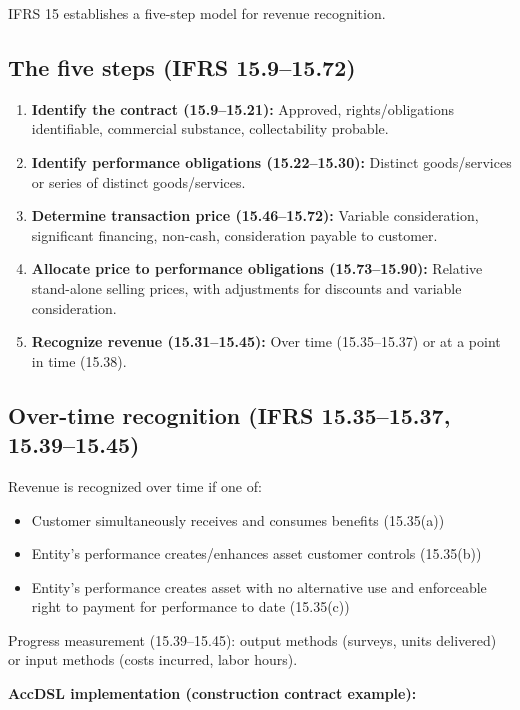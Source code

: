 IFRS 15 establishes a five-step model for revenue recognition.

\subsection{The five steps (IFRS 15.9--15.72)}

\begin{enumerate}
\item \textbf{Identify the contract (15.9--15.21):} Approved, rights/obligations
  identifiable, commercial substance, collectability probable.
\item \textbf{Identify performance obligations (15.22--15.30):} Distinct goods/services
  or series of distinct goods/services.
\item \textbf{Determine transaction price (15.46--15.72):} Variable consideration,
  significant financing, non-cash, consideration payable to customer.
\item \textbf{Allocate price to performance obligations (15.73--15.90):} Relative
  stand-alone selling prices, with adjustments for discounts and variable consideration.
\item \textbf{Recognize revenue (15.31--15.45):} Over time (15.35--15.37) or at
  a point in time (15.38).
\end{enumerate}

\subsection{Over-time recognition (IFRS 15.35--15.37, 15.39--15.45)}

Revenue is recognized over time if one of:
\begin{itemize}
\item Customer simultaneously receives and consumes benefits (15.35(a))
\item Entity's performance creates/enhances asset customer controls (15.35(b))
\item Entity's performance creates asset with no alternative use and enforceable
  right to payment for performance to date (15.35(c))
\end{itemize}

Progress measurement (15.39--15.45): output methods (surveys, units delivered)
or input methods (costs incurred, labor hours).

\textbf{AccDSL implementation (construction contract example):}

